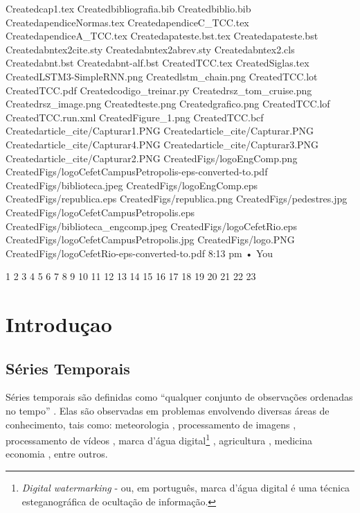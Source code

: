 Createdcap1.tex
Createdbibliografia.bib
Createdbiblio.bib
CreatedapendiceNormas.tex
CreatedapendiceC_TCC.tex
CreatedapendiceA_TCC.tex
Createdapateste.bst.tex
Createdapateste.bst
Createdabntex2cite.sty
Createdabntex2abrev.sty
Createdabntex2.cls
Createdabnt.bst
Createdabnt-alf.bst
CreatedTCC.tex
CreatedSiglas.tex
CreatedLSTM3-SimpleRNN.png
Createdlstm_chain.png
CreatedTCC.lot
CreatedTCC.pdf
Createdcodigo_treinar.py
Createdrsz_tom_cruise.png
Createdrsz_image.png
Createdteste.png
Createdgrafico.png
CreatedTCC.lof
CreatedTCC.run.xml
CreatedFigure_1.png
CreatedTCC.bcf
Createdarticle_cite/Capturar1.PNG
Createdarticle_cite/Capturar.PNG
Createdarticle_cite/Capturar4.PNG
Createdarticle_cite/Capturar3.PNG
Createdarticle_cite/Capturar2.PNG
CreatedFigs/logoEngComp.png
CreatedFigs/logoCefetCampusPetropolis-eps-converted-to.pdf
CreatedFigs/biblioteca.jpeg
CreatedFigs/logoEngComp.eps
CreatedFigs/republica.eps
CreatedFigs/republica.png
CreatedFigs/pedestres.jpg
CreatedFigs/logoCefetCampusPetropolis.eps
CreatedFigs/biblioteca_engcomp.jpeg
CreatedFigs/logoCefetRio.eps
CreatedFigs/logoCefetCampusPetropolis.jpg
CreatedFigs/logo.PNG
CreatedFigs/logoCefetRio-eps-converted-to.pdf
8:13 pm • You

1
2
3
4
5
6
7
8
9
10
11
12
13
14
15
16
17
18
19
20
21
22
23
\section{Introduçao}
 \subsection{Séries Temporais}
 \label{sec:SeriesTemporais}
Séries temporais são definidas como ``qualquer conjunto de observações ordenadas no tempo'' 
    \cite{morettin2006analise}. Elas são observadas em problemas envolvendo diversas áreas de 
    conhecimento, tais como: meteorologia \cite{7982030}, processamento de imagens 
    \cite{7729869,7164182, 6723283}, processamento de vídeos \cite{6469509}, marca d'água 
    digital\footnote{\textit{Digital watermarking} - ou, em português, marca d'água digital é 
    uma técnica esteganográfica de ocultação de informação.} \cite{7024611}, agricultura 
    \cite{6723610}, medicina \cite{6707296} economia \cite{4810671}, entre outros.
 
